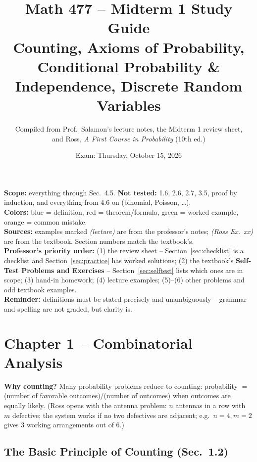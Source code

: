 \documentclass[11pt]{article}
\title{\textbf{Math 477 -- Midterm 1 Study Guide}\\[2pt]\large Counting, Axioms of Probability, Conditional Probability \& Independence, Discrete Random Variables}
\author{Compiled from Prof.\ Salamon's lecture notes, the Midterm 1 review sheet,\\and Ross, \emph{A First Course in Probability} (10th ed.)}
\date{Exam: Thursday, October 15, 2026}
\let\oldsubsection\subsection
\renewcommand{\subsection}{\Needspace{14\baselineskip}\oldsubsection}
\begin{document}
\maketitle
\thispagestyle{fancy}

\begin{tcolorbox}[colback=gray!8,colframe=gray!60,title={How to use this guide}]
\textbf{Scope:} everything through Sec.\ 4.5. \textbf{Not tested:} 1.6, 2.6, 2.7, 3.5, proof by induction, and everything from 4.6 on (binomial, Poisson, \dots).\\[2pt]
\textbf{Colors:} \colorbox{blue!10}{blue} = definition, \colorbox{red!10}{red} = theorem/formula, \colorbox{green!10}{green} = worked example, \colorbox{orange!15}{orange} = common mistake.\\[2pt]
\textbf{Sources:} examples marked \emph{(lecture)} are from the professor's notes; \emph{(Ross Ex.\ xx)} are from the textbook. Section numbers match the textbook's.\\[2pt]
\textbf{Professor's priority order:} (1) the review sheet -- Section~\ref{sec:checklist} is a checklist and Section~\ref{sec:practice} has worked solutions; (2) the textbook's \textbf{Self-Test Problems and Exercises} -- Section~\ref{sec:selftest} lists which ones are in scope; (3) hand-in homework; (4) lecture examples; (5)--(6) other problems and odd textbook examples.\\[2pt]
\textbf{Reminder:} definitions must be stated precisely and unambiguously -- grammar and spelling are not graded, but clarity is.
\end{tcolorbox}

\tableofcontents
\clearpage

\section{Chapter 1 -- Combinatorial Analysis}

\textbf{Why counting?} Many probability problems reduce to counting: probability $=$ (number of favorable outcomes)/(number of outcomes) when outcomes are equally likely. (Ross opens with the antenna problem: $n$ antennas in a row with $m$ defective; the system works if no two defectives are adjacent; e.g.\ $n=4,m=2$ gives 3 working arrangements out of 6.)

\subsection{The Basic Principle of Counting (Sec.\ 1.2)}
\end{document}
